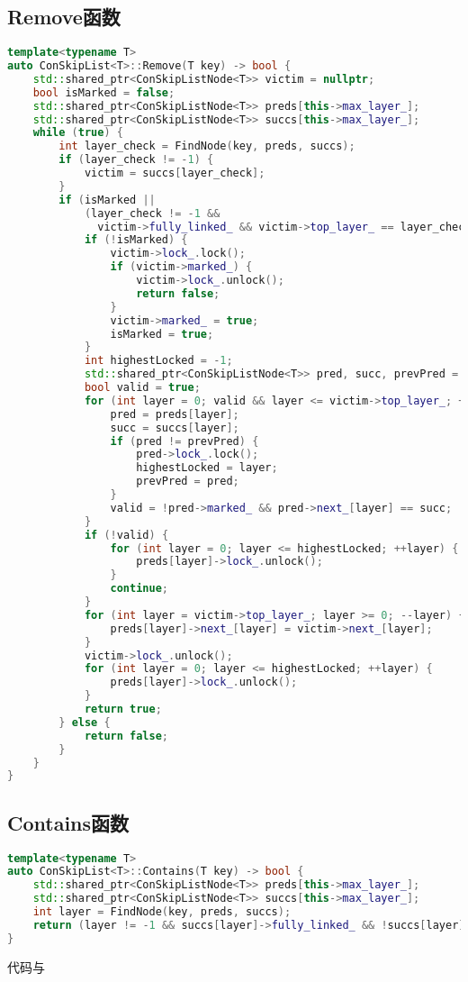 \documentclass[UTF8, 10pt, twocolumn]{article}
\begin{document}
\subsection{Remove函数}
\begin{lstlisting}[language=c++]
template<typename T>
auto ConSkipList<T>::Remove(T key) -> bool {
    std::shared_ptr<ConSkipListNode<T>> victim = nullptr;
    bool isMarked = false;
    std::shared_ptr<ConSkipListNode<T>> preds[this->max_layer_];
    std::shared_ptr<ConSkipListNode<T>> succs[this->max_layer_];
    while (true) {
        int layer_check = FindNode(key, preds, succs);
        if (layer_check != -1) {
            victim = succs[layer_check];
        }
        if (isMarked ||
            (layer_check != -1 &&
              victim->fully_linked_ && victim->top_layer_ == layer_check && !victim->marked_)) {
            if (!isMarked) {
                victim->lock_.lock();
                if (victim->marked_) {
                    victim->lock_.unlock();
                    return false;
                }
                victim->marked_ = true;
                isMarked = true;
            }
            int highestLocked = -1;
            std::shared_ptr<ConSkipListNode<T>> pred, succ, prevPred = nullptr;
            bool valid = true;
            for (int layer = 0; valid && layer <= victim->top_layer_; ++layer) {
                pred = preds[layer];
                succ = succs[layer];
                if (pred != prevPred) {
                    pred->lock_.lock();
                    highestLocked = layer;
                    prevPred = pred;
                }
                valid = !pred->marked_ && pred->next_[layer] == succ;
            }
            if (!valid) {
                for (int layer = 0; layer <= highestLocked; ++layer) {
                    preds[layer]->lock_.unlock();
                }
                continue;
            }
            for (int layer = victim->top_layer_; layer >= 0; --layer) {
                preds[layer]->next_[layer] = victim->next_[layer];
            }
            victim->lock_.unlock();
            for (int layer = 0; layer <= highestLocked; ++layer) {
                preds[layer]->lock_.unlock();
            }
            return true;
        } else {
            return false;
        }
    }
}
\end{lstlisting}

\subsection{Contains函数}
\begin{lstlisting}[language=c++]
template<typename T>
auto ConSkipList<T>::Contains(T key) -> bool {
    std::shared_ptr<ConSkipListNode<T>> preds[this->max_layer_];
    std::shared_ptr<ConSkipListNode<T>> succs[this->max_layer_];
    int layer = FindNode(key, preds, succs);
    return (layer != -1 && succs[layer]->fully_linked_ && !succs[layer]->marked_);
}
\end{lstlisting}

代码与
\end{document}
